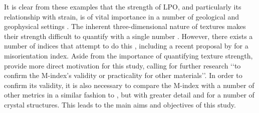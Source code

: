 \documentclass[a4paper,12pt,twoside]{report}
\numberwithin{equation}{chapter}
\begin{document}
It is clear from these examples that the strength of LPO, and particularly its relationship with strain, is of vital importance in a number of geological and geophysical settings \citep[and many more besides, see][for more examples]{Wenk1999}. The inherent three-dimensional nature of textures makes their strength difficult to quantify with a single number \citep{Schaeben2007}. However, there exists a number of indices that attempt to do this \citep[e.g. the texture index][]{bunge1982texture}, including a recent proposal by \cite{Skemer} for a misorientation index. Aside from the importance of quantifying texture strength, \cite{Skemer} provide more direct motivation for this study, calling for further research \lq\lq{}to confirm the M-index's validity or practicality for other materials\rq\rq{}. In order to confirm its validity, it is also necessary to compare the M-index with a number of other metrics in a similar fashion to \cite{Mainprice}, but with greater detail and for a number of crystal structures. This leads to the main aims and objectives of this study.   
   
\end{document}
